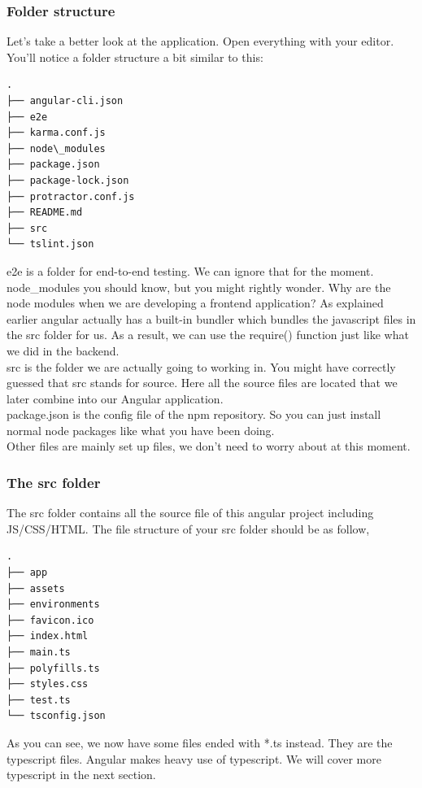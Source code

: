 \documentclass[a4paper]{article}
\begin{document}
\subsubsection{Folder structure}
Let’s take a better look at the application. Open everything with your editor. You’ll notice a folder structure a bit similar to this:
\begin{lstlisting}
.
├── angular-cli.json
├── e2e
├── karma.conf.js
├── node\_modules
├── package.json
├── package-lock.json
├── protractor.conf.js
├── README.md
├── src
└── tslint.json
\end{lstlisting}
e2e is a folder for end-to-end testing. We can ignore that for the moment.\\

node\_modules you should know, but you might rightly wonder. Why are the node modules when we are developing a frontend application? As explained earlier angular actually has a built-in bundler which bundles the javascript files in the src folder for us. As a result, we can use the require() function just like what we did in the backend.\\

src is the folder we are actually going to working in. You might have correctly guessed that src stands for source. Here all the source files are located that we later combine into our Angular application.\\

package.json is the config file of the npm repository. So you can just install normal node packages like what you have been doing.\\

Other files are mainly set up files, we don’t need to worry about at this moment.
\subsubsection{The src folder}
The src folder contains all the source file of this angular project including JS/CSS/HTML. The file structure of your src folder should be as follow,
\begin{lstlisting}
.
├── app
├── assets
├── environments
├── favicon.ico
├── index.html
├── main.ts
├── polyfills.ts
├── styles.css
├── test.ts
└── tsconfig.json
\end{lstlisting}
As you can see, we now have some files ended with *.ts instead. They are the typescript files. Angular makes heavy use of typescript. We will cover more typescript in the next section.\\
\end{document}

